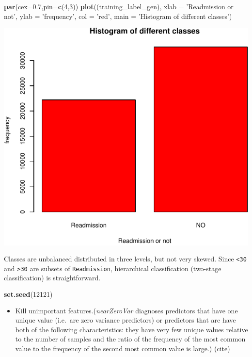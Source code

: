 \documentclass[]{article}
\newenvironment{Shaded}{\begin{snugshade}}{\end{snugshade}}
\newcommand{\KeywordTok}[1]{\textcolor[rgb]{0.13,0.29,0.53}{\textbf{{#1}}}}
\newcommand{\DataTypeTok}[1]{\textcolor[rgb]{0.13,0.29,0.53}{{#1}}}
\newcommand{\DecValTok}[1]{\textcolor[rgb]{0.00,0.00,0.81}{{#1}}}
\newcommand{\FloatTok}[1]{\textcolor[rgb]{0.00,0.00,0.81}{{#1}}}
\newcommand{\StringTok}[1]{\textcolor[rgb]{0.31,0.60,0.02}{{#1}}}
\newcommand{\NormalTok}[1]{{#1}}
\begin{document}
\begin{Shaded}
\begin{Highlighting}[]
\KeywordTok{par}\NormalTok{(}\DataTypeTok{cex=}\FloatTok{0.7}\NormalTok{,}\DataTypeTok{pin=}\KeywordTok{c}\NormalTok{(}\DecValTok{4}\NormalTok{,}\DecValTok{3}\NormalTok{))}
\KeywordTok{plot}\NormalTok{((training_label_gen), }\DataTypeTok{xlab =} \StringTok{'Readmission or not'}\NormalTok{, }\DataTypeTok{ylab =} \StringTok{'frequency'}\NormalTok{,}
     \DataTypeTok{col =} \StringTok{'red'}\NormalTok{, }\DataTypeTok{main =} \StringTok{'Histogram of different classes'}\NormalTok{)}
\end{Highlighting}
\end{Shaded}

\includegraphics{Project_files/figure-latex/Preprocessing_classtype-2.pdf}

Classes are unbalanced distributed in three levels, but not very skewed.
Since \texttt{\textless{}30} and \texttt{\textgreater{}30} are subsets
of \texttt{Readmission}, hierarchical classification (two-stage
classification) is straightforward.

\begin{Shaded}
\begin{Highlighting}[]
\KeywordTok{set.seed}\NormalTok{(}\DecValTok{12121}\NormalTok{)}
\end{Highlighting}
\end{Shaded}

\begin{itemize}
\itemsep1pt\parskip0pt
\item
  Kill unimportant features.(\emph{nearZeroVar} diagnoses predictors
  that have one unique value (i.e.~are zero variance predictors) or
  predictors that are have both of the following characteristics: they
  have very few unique values relative to the number of samples and the
  ratio of the frequency of the most common value to the frequency of
  the second most common value is large.) (cite)
\end{itemize}
\end{document}
